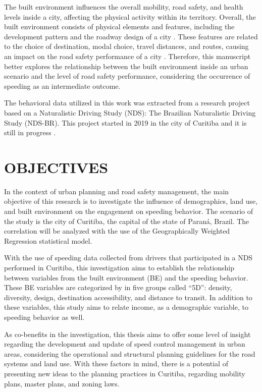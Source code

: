 The built environment influences the overall mobility, road safety, and health levels inside a city, affecting the physical activity within its territory. Overall, the built environment consists of physical elements and features, including the development pattern and the roadway design of a city \cite{Ewing2010}. These features are related to the choice of destination, modal choice, travel distances, and routes, causing an impact on the road safety performance of a city \cite{Tiwari}. Therefore, this manuscript better explores the relationship between the built environment inside an urban scenario and the level of road safety performance, considering the occurrence of speeding as an intermediate outcome.


The behavioral data utilized in this work was extracted from a research project based on a Naturalistic Driving Study (NDS): The Brazilian Naturalistic Driving Study (NDS-BR). This project started in 2019 in the city of Curitiba and it is still in progress \cite{ceppur_estudo_2021}. 

\section{OBJECTIVES}

In the context of urban planning and road safety management, the main objective of this research is to investigate the influence of demographics, land use, and built environment on the engagement on speeding behavior. The scenario of the study is the city of Curitiba, the capital of the state of Paraná, Brazil. The correlation will be analyzed with the use of the Geographically Weighted Regression statistical model.

With the use of speeding data collected from drivers that participated in a NDS performed in Curitiba, this investigation aims to establish the relationship between variables from the built environment (BE) and the speeding behavior. These BE variables are categorized by \textcite{Ewing2009} in five groups called ``5D'': density, diversity, design, destination accessibility, and distance to transit. In addition to these variables, this study aims to relate income, as a demographic variable, to speeding behavior as well.

As co-benefits in the investigation, this thesis aims to offer some level of insight regarding the development and update of speed control management in urban areas, considering the operational and structural planning guidelines for the road systems and land use. With these factors in mind, there is a potential of presenting new ideas to the planning practices in Curitiba, regarding mobility plans, master plans, and zoning laws.
    
